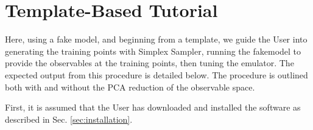 \documentclass[main.tex]{subfiles}
\begin{document}
\setcounter{section}{6}
\section{Template-Based Tutorial}\label{sec:tutorial}

Here, using a fake model, and beginning from a template, we guide the User into generating the training points with Simplex Sampler, running the fakemodel to provide the observables at the training points, then tuning the emulator. The expected output from this procedure is detailed below. The procedure is outlined both with and without the PCA reduction of the observable space.

First, it is assumed that the User has downloaded and installed the software as described in Sec. \ref{sec:installation}. 
\end{document}
